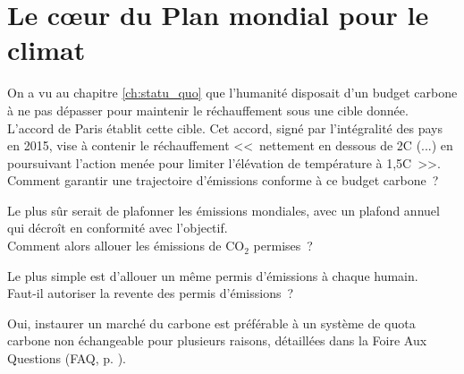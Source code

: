 \documentclass[a5paper,french,openany]{memoir}
\begin{document}



\chapter{Le cœur du Plan mondial pour le climat\label{ch:coeur}}


On a vu au chapitre \ref{ch:statu_quo} que l'humanité disposait d'un budget carbone à ne pas dépasser pour maintenir le réchauffement sous une cible donnée. L'accord de Paris établit cette cible. Cet accord, signé par l'intégralité des pays en 2015,  vise à contenir le réchauffement <<~nettement en dessous de 2\textdegree{}C (...) en poursuivant l'action menée pour limiter l'élévation de température à 1,5\textdegree{}C~>>. \\

Comment garantir une trajectoire d'émissions conforme à ce budget carbone~? 

Le plus sûr serait de plafonner les émissions mondiales, avec un plafond annuel qui décroît en conformité avec l'objectif. \\

Comment alors allouer les émissions de CO$_\text{2}$ permises~? 

Le plus simple %
est d'allouer un même permis d'émissions à chaque humain. \\

Faut-il autoriser la revente des permis d'émissions~? 

Oui, %
instaurer un marché du carbone est préférable à un système de quota carbone non échangeable pour plusieurs raisons, détaillées dans la Foire Aux Questions (FAQ, p. \pageref{q:rationnement}). %
\end{document}
